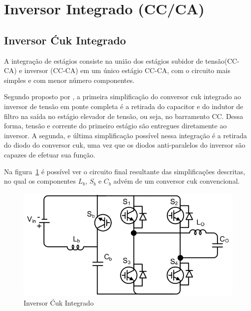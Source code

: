 \documentclass[
	12pt,				%
	openany,
	onseside,
	a4paper,			%
	english,			%
	french,				%
	spanish,			%
	brazil,				%
	]{abntex2}
\begin{document}
\section{Inversor Integrado (CC/CA)}
\subsection{Inversor Ćuk Integrado}

A integração de estágios consiste na união dos estágios subidor de tensão(CC-CA) e inversor (CC-CA) em um único estágio CC-CA, com o circuito mais simples e com menor número componentes. 

Segundo proposto por , a primeira simplificação do conversor cuk integrado ao inversor de tensão em ponte completa é a retirada do capacitor e do indutor de filtro na saída no estágio elevador de tensão, ou seja, no barramento CC. Dessa forma, tensão e corrente do primeiro estágio são entregues diretamente ao inversor. A segunda, e última simplificação possível nessa integração é a retirada do diodo do conversor cuk, uma vez que os diodos anti-paralelos do inversor são capazes de efetuar sua função.

Na figura~\ref{fig:integ_cuk_circ} é possível ver o circuito final resultante das simplificações descritas, no qual os componentes $L_b$, $S_b$ e $C_b$ advém de um conversor cuk convencional. 


\begin{figure}[H]
	\begin{center}
		\includegraphics[width=0.65 \linewidth]{integ_cuk_circ}
		\caption{Inversor Ćuk Integrado \cite{LUIGI_int_top}}
		\label{fig:integ_cuk_circ}
	\end{center}
\end{figure}

\end{document}
